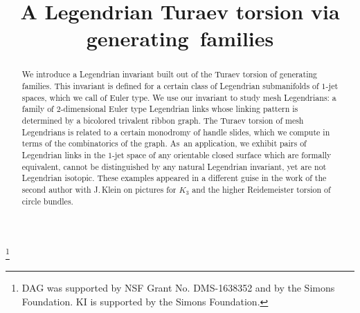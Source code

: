 \documentclass[JEP,XML,SOM,Unicode,NoFloatCountersInSection]{cedram}
\theoremstyle{plain}
\theoremstyle{definition}
\begin{document}
\frontmatter
\title{A Legendrian Turaev torsion via generating~families}

\author[\initial{D.} \lastname{Álvarez-Gavela}]{ }
\address{Department of Mathematics, Princeton University\\
Princeton, NJ 086540, USA}

\author[\initial{K.} \lastname{Igusa}]{ }
\address{Department of Mathematics, Brandeis University\\
PO Box 9110, Waltham, MA 02454-9110, USA}

\thanks{DAG was supported by NSF Grant No. DMS-1638352 and by the Simons Foundation. KI is supported by the Simons Foundation.}

\begin{abstract}
We introduce a Legendrian invariant built out of the Turaev torsion of generating families. This invariant is defined for a certain class of Legendrian submanifolds of $1$-jet spaces, which we call of Euler type. We use our invariant to study mesh Legendrians: a family of $2$-dimensional Euler type Legendrian links whose linking pattern is determined by a bicolored trivalent ribbon graph. The Turaev torsion of mesh Legendrians is related to a certain monodromy of handle slides, which we compute in terms of the combinatorics of the graph. As~an application, we exhibit pairs of Legendrian links in the $1$-jet space of any orientable closed surface which are formally equivalent, cannot be distinguished by any natural Legendrian invariant, yet are not Legendrian isotopic. These examples appeared in a different guise in the work of the second author with J.\,Klein on pictures for $K_3$ and the higher Reidemeister torsion of circle bundles.
\end{abstract}




\end{document}
